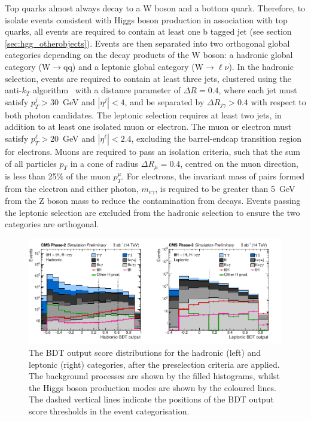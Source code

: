 Top quarks almost always decay to a W boson and a bottom quark. Therefore, to isolate events consistent with Higgs boson production in association with top quarks, all events are required to contain at least one b tagged jet (see section \ref{sec:hgg_otherobjects}). Events are then separated into two orthogonal global categories depending on the decay products of the W boson: a hadronic global category (W$\rightarrow$qq) and a leptonic global category (W$\rightarrow\ell\nu$). In the hadronic selection, events are required to contain at least three jets, clustered using the anti-$k_T$ algorithm~\cite{Cacciari:2008gp,Cacciari:2011ma} with a distance parameter of $\Delta R=0.4$, where each jet must satisfy $p_T^j>30$~GeV and $|\eta^j|<4$, and be separated by $\Delta R_{j\gamma}>0.4$ with respect to both photon candidates. The leptonic selection requires at least two jets, in addition to at least one isolated muon or electron. The muon or electron must satisfy $p_T^\ell>20$~GeV and $|\eta^\ell|<2.4$, excluding the barrel-endcap transition region for electrons. Muons are required to pass an isolation criteria, such that the sum of all particles $p_T$ in a cone of radius $\Delta R_{\mu}=0.4$, centred on the muon direction, is less than 25\% of the muon $p_T^\mu$. For electrons, the invariant mass of pairs formed from the electron and either photon, $m_{e\gamma}$, is required to be greater than 5~GeV from the Z boson mass to reduce the contamination from \Zee decays. Events passing the leptonic selection are excluded from the hadronic selection to ensure the two categories are orthogonal.

\begin{figure}[htb!]
  \centering
  \includegraphics[width=1\textwidth]{Figures/cms/trilinear/CMS-PAS-FTR-18-020_Figure_002.pdf}
  \caption[BDT output score distributions for the HL-LHC sensitivity study]
  {
    The BDT output score distributions for the hadronic (left) and leptonic (right) categories, after the preselection criteria are applied. The background processes are shown by the filled histograms, whilst the Higgs boson production modes are shown by the coloured lines. The dashed vertical lines indicate the positions of the BDT output score thresholds in the event categorisation.
  }
  \label{fig:trilinear_bdt}
\end{figure}

